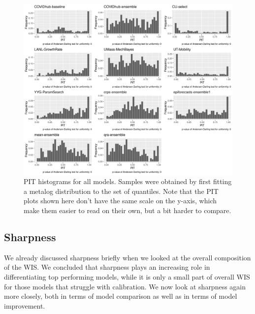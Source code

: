 \documentclass[
]{book}
\begin{document}
\begin{figure}
\includegraphics[width=1\linewidth]{../visualisation/chapter-5-results/scenario-baseline/all-pit-plots} \caption{PIT histograms for all models. Samples were obtained by first fitting a metalog distribution to the set of quantiles. Note that the PIT plots shown here don't have the same scale on the y-axis, which make them easier to read on their own, but a bit harder to compare. }\label{fig:all-pit-plots}
\end{figure}

\hypertarget{sharpness}{%
\subsection{Sharpness}\label{sharpness}}

We already discussed sharpness briefly when we looked at the overall composition of the WIS. We concluded that sharpness plays an increasing role in differentiating top performing models, while it is only a small part of overall WIS for those models that struggle with calibration. We now look at sharpness again more closely, both in terms of model comparison as well as in terms of model improvement.
\end{document}
